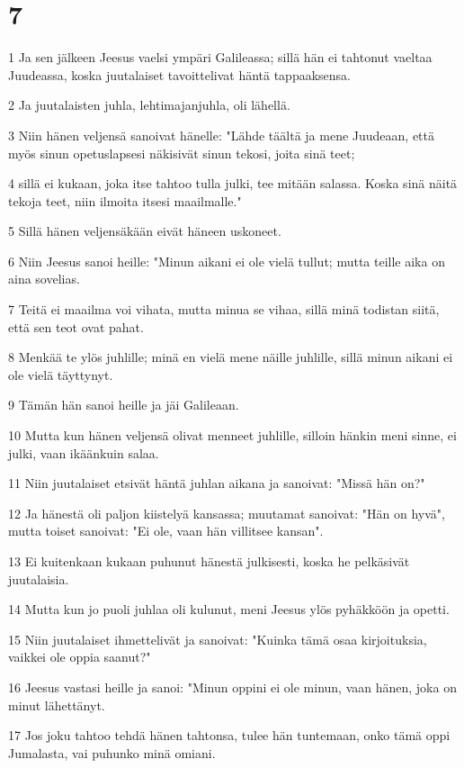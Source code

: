 \chapter{7}

\par 1 Ja sen jälkeen Jeesus vaelsi ympäri Galileassa; sillä hän ei tahtonut vaeltaa Juudeassa, koska juutalaiset tavoittelivat häntä tappaaksensa.
\par 2 Ja juutalaisten juhla, lehtimajanjuhla, oli lähellä.
\par 3 Niin hänen veljensä sanoivat hänelle: "Lähde täältä ja mene Juudeaan, että myös sinun opetuslapsesi näkisivät sinun tekosi, joita sinä teet;
\par 4 sillä ei kukaan, joka itse tahtoo tulla julki, tee mitään salassa. Koska sinä näitä tekoja teet, niin ilmoita itsesi maailmalle."
\par 5 Sillä hänen veljensäkään eivät häneen uskoneet.
\par 6 Niin Jeesus sanoi heille: "Minun aikani ei ole vielä tullut; mutta teille aika on aina sovelias.
\par 7 Teitä ei maailma voi vihata, mutta minua se vihaa, sillä minä todistan siitä, että sen teot ovat pahat.
\par 8 Menkää te ylös juhlille; minä en vielä mene näille juhlille, sillä minun aikani ei ole vielä täyttynyt.
\par 9 Tämän hän sanoi heille ja jäi Galileaan.
\par 10 Mutta kun hänen veljensä olivat menneet juhlille, silloin hänkin meni sinne, ei julki, vaan ikäänkuin salaa.
\par 11 Niin juutalaiset etsivät häntä juhlan aikana ja sanoivat: "Missä hän on?"
\par 12 Ja hänestä oli paljon kiistelyä kansassa; muutamat sanoivat: "Hän on hyvä", mutta toiset sanoivat: "Ei ole, vaan hän villitsee kansan".
\par 13 Ei kuitenkaan kukaan puhunut hänestä julkisesti, koska he pelkäsivät juutalaisia.
\par 14 Mutta kun jo puoli juhlaa oli kulunut, meni Jeesus ylös pyhäkköön ja opetti.
\par 15 Niin juutalaiset ihmettelivät ja sanoivat: "Kuinka tämä osaa kirjoituksia, vaikkei ole oppia saanut?"
\par 16 Jeesus vastasi heille ja sanoi: "Minun oppini ei ole minun, vaan hänen, joka on minut lähettänyt.
\par 17 Jos joku tahtoo tehdä hänen tahtonsa, tulee hän tuntemaan, onko tämä oppi Jumalasta, vai puhunko minä omiani.
